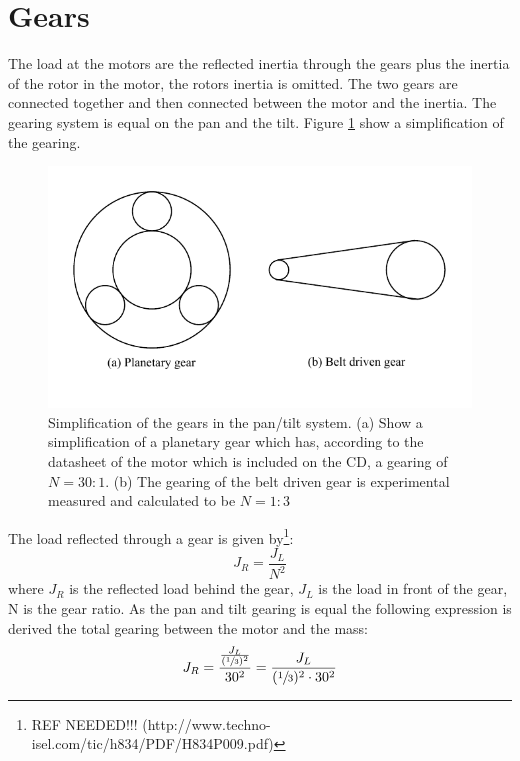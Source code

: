 \section{Gears}
The load at the motors are the reflected inertia through the gears plus the inertia of the rotor in the motor, the rotors inertia is omitted. The two gears are connected together and then connected between the motor and the inertia. The gearing system is equal on the pan and the tilt. Figure \ref{fig:app_gears} show a simplification of the gearing.
\begin{figure}[htb]
	\begin{center}
	\includegraphics[scale=1,trim=0 0 0 0]{graphics/gears.pdf} %
	\caption{Simplification of the gears in the pan/tilt system. (a) Show a simplification of a planetary gear which has, according to the datasheet of the motor which is included on the CD, a gearing of $N = 30:1$. (b) The gearing of the belt driven gear is experimental measured and calculated to be $N = 1:3$}
	\label{fig:app_gears}			%
	\end{center}
\end{figure}
The load reflected through a gear is given by\footnote{REF NEEDED!!!   (http://www.techno-isel.com/tic/h834/PDF/H834P009.pdf)}:
\begin{equation}
	J_R = \frac{J_L}{N^{2}}
\end{equation}
where $J_R$ is the reflected load behind the gear, $J_L$ is the load in front of the gear, N is the gear ratio. As the pan and tilt gearing is equal the following expression is derived the total gearing between the motor and the mass:
\begin{equation}
	J_R = \frac{\frac{J_L}{(\sfrac{1}{3})^{2}}}{30^{2}} = \frac{J_L}{(\sfrac{1}{3})^{2} \cdot 30^{2}}\label{app:eq_reflected_inertia_temp}
\end{equation}

